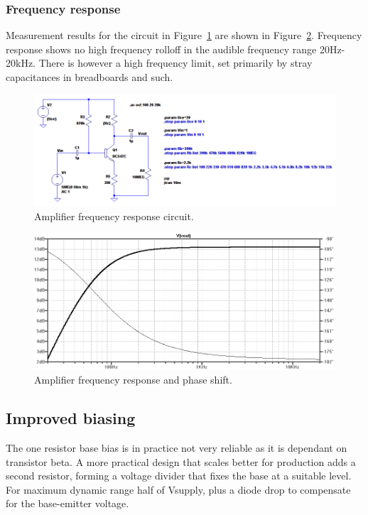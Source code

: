\documentclass[11pt,a4paper]{article}
\begin{document}
\subsubsection{Frequency response}\label{frequency-response}
Measurement results for the circuit in Figure~\ref{fig:6_amplifier-av_schem} are shown in Figure~\ref{fig:6_amplifier-av_bode}.
Frequency response shows no high frequency rolloff in the audible frequency
range 20Hz-20kHz. There is however a high frequency limit, set primarily by
stray capacitances in breadboards and such.

\begin{figure}[htbp]
    \centering
    \includegraphics[width=\textwidth]{img/6_amplifier-av_schem.png}
    \caption{Amplifier frequency response circuit.}
    \label{fig:6_amplifier-av_schem}
\end{figure}

\begin{figure}[htbp]
    \centering
    \includegraphics[width=\textwidth]{img/6_amplifier-av_bode.png}
    \caption{Amplifier frequency response and phase shift.}
    \label{fig:6_amplifier-av_bode}
\end{figure}


\subsection{Improved biasing}\label{improved-biasing}
The one resistor base bias is in practice not very reliable as it is dependant
on transistor beta. A more practical design that scales better for production
adds a second resistor, forming a voltage divider that fixes the base at a
suitable level. For maximum dynamic range half of Vsupply, plus a diode drop to
compensate for the base-emitter voltage.
\end{document}
